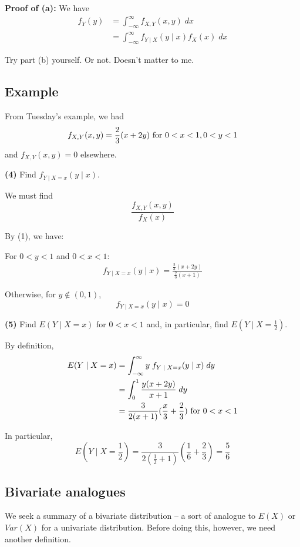 \documentclass[12pt]{article}
\begin{document}
\textbf{Proof of (a):} We have
\begin{align*}
    f_Y (y) &= \int_{-\infty}^{\infty} f_{X,Y} (x,y) \; dx \\
        &= \int_{-\infty}^{\infty} f_{Y \; | \; X} (y \; | \; x) f_X (x) \; dx
\end{align*}

Try part (b) yourself. Or not. Doesn't matter to me.

\subsection{Example}
From Tuesday's example, we had
\[
    f_{X,Y} (x,y) = \frac{2}{3} (x + 2y) \textnormal{ for } 0 < x < 1, 0 < y < 1
\]
and $f_{X,Y} (x,y) = 0$ elsewhere.

\textbf{(4)} Find $f_{Y \; | \; X = x} (y \; | \; x)$.

We must find
\[
    \frac{f_{X,Y} (x,y)}{f_X (x)}
\]

By (1), we have:

For $0 < y < 1$ and $0 < x < 1$:
\begin{align*}
    f_{Y \; | \; X = x} (y \; | \; x) = \frac{\frac{2}{3} (x + 2y)}{\frac{2}{3} (x+1)}
\end{align*}

Otherwise, for $y \notin (0,1)$, 
\[
    f_{Y \; | \; X = x} (y \; | \; x) = 0
\]

\textbf{(5)} Find $E(Y \; | \; X = x)$ for $0 < x < 1$ and, in particular, find $E(Y \; | \; X = \frac{1}{2})$.

By definition,
\begin{align*}
    E(Y \; | \; X = x) &= \int_{-\infty}^{\infty} y \; f_{Y \; | \; X = x} (y \; | \; x) \; dy \\
        &= \int_0^1 \frac{y(x + 2y)}{x + 1} \; dy \\
        &= \frac{3}{2(x+1)} (\frac{x}{3} + \frac{2}{3}) \textnormal{ for } 0 < x < 1
\end{align*}

In particular,
\[
    E(Y \; | \; X = \frac{1}{2}) = \frac{3}{2(\frac{1}{2} + 1)} (\frac{1}{6} + \frac{2}{3}) = \frac{5}{6}
\]

\subsection{Bivariate analogues}
We seek a summary of a bivariate distribution -- a sort of analogue to $E(X)$ or $Var(X)$ for a univariate distribution. Before doing this, however, we need another definition.
\end{document}
